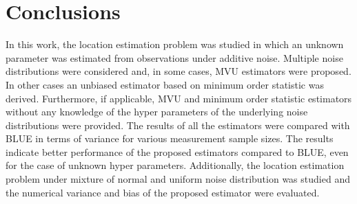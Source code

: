 \documentclass[journal]{IEEEtran}
\begin{document}
\section{Conclusions}\label{sec:conclusions}
In this work, the location estimation problem was studied in which an unknown parameter was estimated from observations under additive noise. Multiple noise distributions were considered and, in some cases, MVU estimators were proposed. In other cases an unbiased estimator based on minimum order statistic was derived. Furthermore, if applicable, MVU and minimum order statistic estimators without any knowledge of the hyper parameters of the underlying noise distributions were provided. The results of all the estimators were compared with BLUE in terms of variance for various measurement sample sizes. The results indicate better performance of the proposed estimators compared to BLUE, even for the case of unknown hyper parameters. Additionally, the location estimation problem under mixture of normal and uniform noise distribution was studied and the numerical variance and bias of the proposed estimator were evaluated.



\end{document}
